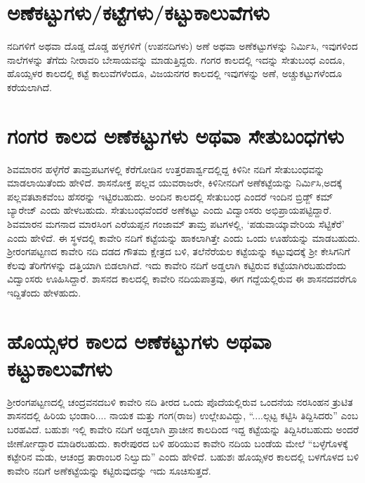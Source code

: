 \section{ಅಣೆಕಟ್ಟುಗಳು/ಕಟ್ಟೆಗಳು/ಕಟ್ಟುಕಾಲುವೆಗಳು}

ನದಿಗಳಿಗೆ ಅಥವಾ ದೊಡ್ಡ ದೊಡ್ಡ ಹಳ್ಳಗಳಿಗೆ (ಉಪನದಿಗಳು) ಅಣೆ ಅಥವಾ ಅಣೆಕಟ್ಟುಗಳನ್ನು ನಿರ್ಮಿಸಿ, ಇವುಗಳಿಂದ ನಾಲೆಗಳನ್ನು ತೆಗೆದು ನೀರಾವರಿ ಬೇಸಾಯವನ್ನು ಮಾಡುತ್ತಿದ್ದರು. ಗಂಗರ ಕಾಲದಲ್ಲಿ ಇದನ್ನು ಸೇತುಬಂಧ ಎಂದೂ, ಹೊಯ್ಸಳರ ಕಾಲದಲ್ಲಿ ಕಟ್ಟೆ ಕಾಲುವೆಗಳೆಂದೂ, ವಿಜಯನಗರ ಕಾಲದಲ್ಲಿ ಇವುಗಳನ್ನು ಅಣೆ, ಅಚ್ಚುಕಟ್ಟುಗಳೆಂದೂ ಕರೆಯಲಾಗಿದೆ.


\section{ಗಂಗರ ಕಾಲದ ಅಣೆಕಟ್ಟುಗಳು ಅಥವಾ ಸೇತುಬಂಧಗಳು}

ಶಿವಮಾರನ ಹಳ್ಳೆಗೆರೆ ತಾಮ್ರಪಟಗಳಲ್ಲಿ ಕೆರೆಗೋಡಿನ ಉತ್ತರಪಾರ್ಶ್ವದಲ್ಲಿದ್ದ ಕಿಳಿನೀ ನದಿಗೆ ಸೇತುಬಂಧವನ್ನು ಮಾಡಲಾಯಿತೆಂದು ಹೇಳಿದೆ. ಶಾಸನೋಕ್ತ ಪಲ್ಲವ ಯುವರಾಜರೇ, ಕಿಳಿನೀನದಿಗೆ ಅಣೆಕಟ್ಟೆಯನ್ನು ನಿರ್ಮಿಸಿ,ಅದಕ್ಕೆ ಪಲ್ಲವತಟಾಕವೆಂಬ ಹೆಸರನ್ನು ಇಟ್ಟಿರಬಹುದು. ಅಂದಿನ ಕಾಲದಲ್ಲಿ ಸೇತುಬಂಧ ಎಂದರೆ ಇಂದಿನ ಬ್ರಿಡ್ಜ್​ ಕಮ್ ಬ್ಯಾರೇಜ್​ ಎಂದು ಹೇಳಬಹುದು. ಸೇತುಬಂಧವೆಂದರೆ ಅಣೆಕಟ್ಟು ಎಂದು ವಿದ್ವಾಂಸರು ಅಭಿಪ್ರಾಯಪಟ್ಟಿದ್ದಾರೆ. ಶಿವಮಾರನ ಮಗನಾದ ಮಾರಸಿಂಗ ಎರೆಯಪ್ಪನ ಗಂಜಾಮ್ ತಾಮ್ರ ಪಟಗಳಲ್ಲಿ, ‘ಪಡುವಾಯ್ಕಾವೇರಿಯ ಸೆಟ್ಟಿಕೆರೆ’ ಎಂದು ಹೇಳಿದೆ. ಈ ಸ್ಥಳದಲ್ಲಿ ಕಾವೇರಿ ನದಿಗೆ ಕಟ್ಟೆಯನ್ನು ಹಾಕಲಾಗಿತ್ತೇ ಎಂದು ಒಂದು ಊಹೆಯನ್ನು ಮಾಡಬಹುದು. ಶ‍್ರೀರಂಗಪಟ್ಟಣದ ಕಾವೇರಿ ನದಿ ದಡದ ಗೌತಮ ಕ್ಷೇತ್ರದ ಬಳಿ, ತಲೆನೆರೆಯಲ ಕಟ್ಟೆಯನ್ನು ಕಟ್ಟುವುದಕ್ಕೆ ಶ‍್ರೀ ಕೇಸಿಗನಿಗೆ ಕೆಲವು ತೆರಿಗೆಗಳನ್ನು ದತ್ತಿಯಾಗಿ ಬಿಡಲಾಗಿದೆ. ಇದು ಕಾವೇರಿ ನದಿಗೆ ಅಡ್ಡಲಾಗಿ ಕಟ್ಟಿರುವ ಕಟ್ಟೆಯಾಗಿರಬಹುದೆಂದು ವಿದ್ವಾಂಸರು ಊಹಿಸಿದ್ದಾರೆ. ಶಾಸನದ ಕಾಲದಲ್ಲಿ ಕಾವೇರಿ ನದಿಯಪಾತ್ರವು, ಈಗ ಗದ್ದೆಯಲ್ಲಿರುವ ಈ ಶಾಸನದವರೆಗೂ ಇದ್ದಿತೆಂದು ಹೇಳಹುದು.


\section{ಹೊಯ್ಸಳರ ಕಾಲದ ಅಣೆಕಟ್ಟುಗಳು ಅಥವಾ ಕಟ್ಟುಕಾಲುವೆಗಳು}

ಶ‍್ರೀರಂಗಪಟ್ಟಣದಲ್ಲಿ ಚಂದ್ರವನದಬಳಿ ಕಾವೇರಿ ನದಿ ತೀರದ ಒಂದು ಪೊದೆಯಲ್ಲಿರುವ ಒಂದನೆಯ ನರಸಿಂಹನ ತ್ರುಟಿತ ಶಾಸನದಲ್ಲಿ ಹಿರಿಯ ಭಂಡಾರಿ.... ನಾಯಕ ಮತ್ತು ಗಂಗ(ರಾಜ) ಉಲ್ಲೇಖವಿದ್ದು, “....ಲ್ಗಟ್ಟ ಕಟ್ಟಿಸಿ ತಿದ್ದಿಸಿದರು” ಎಂಬ ಬರಹವಿದೆ. ಬಹುಶಃ ಇಲ್ಲಿ ಕಾವೇರಿ ನದಿಗೆ ಅಡ್ಡಲಾಗಿ ಪ್ರಾಚೀನ ಕಾಲದಿಂದ ಇದ್ದ ಕಟ್ಟೆಯನ್ನು ತಿದ್ದಿಸಿರಬಹುದು ಅಂದರೆ ಜೀರ್ಣೋದ್ಧಾರ ಮಾಡಿರಬಹುದು. ಕಾರೇಪುರದ ಬಳಿ ಹರಿಯುವ ಕಾವೇರಿ ನದಿಯ ಬಂಡೆಯ ಮೇಲೆ “ಬಳ್ಳೆಗೊಳಕ್ಕೆ ಕಟ್ಟೇರಿನ ಮಡು, ಆಚಂದ್ರ ತಾರಾಂಬರ ನಿಲ್ವುದು” ಎಂದು ಹೇಳಿದೆ. ಬಹುಶಃ ಹೊಯ್ಸಳರ ಕಾಲದಲ್ಲಿ ಬಳಗೊಳದ ಬಳಿ ಕಾವೇರಿ ನದಿಗೆ ಅಣೆಕಟ್ಟೆಯನ್ನು ಕಟ್ಟಿರುವುದನ್ನು ಇದು ಸೂಚಿಸುತ್ತದೆ.

